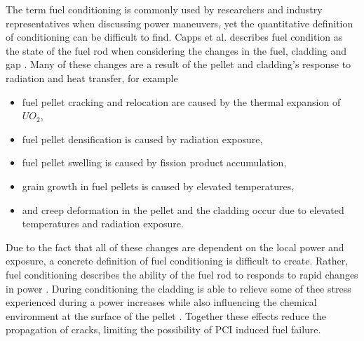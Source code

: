 \documentclass[edeposit,fullpage,11pt]{uiucthesis2009}
\begin{document}
The term fuel conditioning is commonly used by researchers and industry representatives when discussing power maneuvers, yet the quantitative definition of conditioning can be difficult to find.
Capps et al. describes fuel condition as the state of the fuel rod when considering the changes in the fuel, cladding and gap \cite{capps_evaluation_2016}.
Many of these changes are a result of the pellet and cladding's response to radiation and heat transfer, for example
\begin{itemize}
\item fuel pellet cracking and relocation are caused by the thermal expansion of $UO_2$,
\item fuel pellet densification is caused by radiation exposure,
\item fuel pellet swelling is caused by fission product accumulation,
\item grain growth in fuel pellets is caused by elevated temperatures,
\item and creep deformation in the pellet and the cladding occur due to elevated temperatures and radiation exposure.
\end{itemize}
Due to the fact that all of these changes are dependent on the local power and exposure, a concrete definition of fuel conditioning is difficult to create.
Rather, fuel conditioning describes the ability of the fuel rod to responds to rapid changes in power \cite{capps_evaluation_2016}.
During conditioning the cladding is able to relieve some of thee stress experienced during a power increases while also influencing the chemical environment at the surface of the pellet \cite{cox_pellet-clad_1990}.
Together these effects reduce the propagation of cracks, limiting the possibility of \gls{PCI} induced fuel failure.
\end{document}
